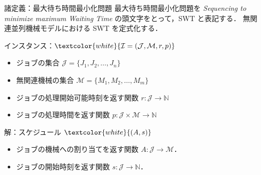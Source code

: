 \documentclass[dvipdfmx]{beamer}
\begin{document}
    \begin{frame}{諸定義：最大待ち時間最小化問題}
      最大待ち時間最小化問題を {\it \alert{S}equencing to minimize maximum \alert{W}aiting \alert{T}ime} の頭文字をとって，\alert{SWT} と表記する．
      無関連並列機械モデルにおける SWT を定式化する．
      \begin{block}{インスタンス：$\textcolor{white}{\mathcal{I} = (\mathcal{J}, \mathcal{M}, r, p)}$}
        \begin{itemize}
          \item {ジョブの集合 $\mathcal{J} = \{J_1,J_2,\ldots,J_n\}$}
          \item {無関連機械の集合 $\mathcal{M} = \{M_1,M_2,\ldots,M_m\}$}
          \item {ジョブの処理開始可能時刻を返す関数 $r : \mathcal{J} \to \mathbb{N}$}
          \item {ジョブの処理時間を返す関数 $p : \mathcal{J} \times \mathcal{M} \to \mathbb{N}$}
        \end{itemize}
      \end{block}
      \begin{block}{解：スケジュール $\textcolor{white}{(A,s)}$}
        \begin{itemize}
          \item ジョブの機械への割り当てを返す関数 $A : \mathcal{J} \to \mathcal{M}$．
          \item ジョブの開始時刻を返す関数 $s : \mathcal{J} \to \mathbb{N}$．
        \end{itemize}
      \end{block}
    \end{frame}
\end{document}
